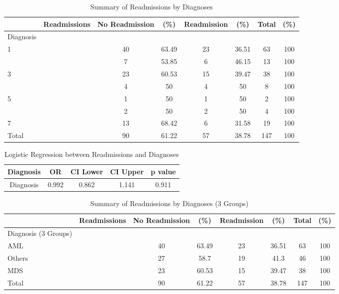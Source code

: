\documentclass[12pt,]{article}
\begin{document}
\pagebreak

\begin{table}[!h]

\caption{\label{tab:unnamed-chunk-46}Summary of Readmissions by Diagnoses}
\centering
\begin{tabular}{>{\centering\arraybackslash}p{5cm}ccccccc}
\toprule
  & Readmissions & No Readmission & (\%) & Readmission & (\%) & Total & (\%)\\
\midrule
Diagnosis &  &  &  &  &  &  & \\
\rowcolor[HTML]{E3E5E7}  1 &  & 40 & 63.49 & 23 & 36.51 & 63 & 100\\
2 &  & 7 & 53.85 & 6 & 46.15 & 13 & 100\\
\rowcolor[HTML]{E3E5E7}  3 &  & 23 & 60.53 & 15 & 39.47 & 38 & 100\\
4 &  & 4 & 50 & 4 & 50 & 8 & 100\\
\addlinespace
\rowcolor[HTML]{E3E5E7}  5 &  & 1 & 50 & 1 & 50 & 2 & 100\\
6 &  & 2 & 50 & 2 & 50 & 4 & 100\\
\rowcolor[HTML]{E3E5E7}  7 &  & 13 & 68.42 & 6 & 31.58 & 19 & 100\\
Total &  & 90 & 61.22 & 57 & 38.78 & 147 & 100\\
\bottomrule
\end{tabular}
\end{table}

\begin{table}[!h]

\caption{\label{tab:unnamed-chunk-46}Logistic Regression between Readmissions and Diagnoses}
\centering
\begin{tabular}{ccccc}
\toprule
Diagnosis & OR & CI Lower & CI Upper & p value\\
\midrule
\rowcolor{white}  Diagnosis & 0.992 & 0.862 & 1.141 & 0.911\\
\bottomrule
\end{tabular}
\end{table}

\begin{table}[!h]

\caption{\label{tab:unnamed-chunk-46}Summary of Readmissions by Diagnoses (3 Groups)}
\centering
\begin{tabular}{>{\centering\arraybackslash}p{5cm}ccccccc}
\toprule
  & Readmissions & No Readmission & (\%) & Readmission & (\%) & Total & (\%)\\
\midrule
Diagnosis (3 Groups) &  &  &  &  &  &  & \\
\rowcolor[HTML]{E3E5E7}  AML &  & 40 & 63.49 & 23 & 36.51 & 63 & 100\\
Others &  & 27 & 58.7 & 19 & 41.3 & 46 & 100\\
\rowcolor[HTML]{E3E5E7}  MDS &  & 23 & 60.53 & 15 & 39.47 & 38 & 100\\
Total &  & 90 & 61.22 & 57 & 38.78 & 147 & 100\\
\bottomrule
\end{tabular}
\end{table}
\end{document}
